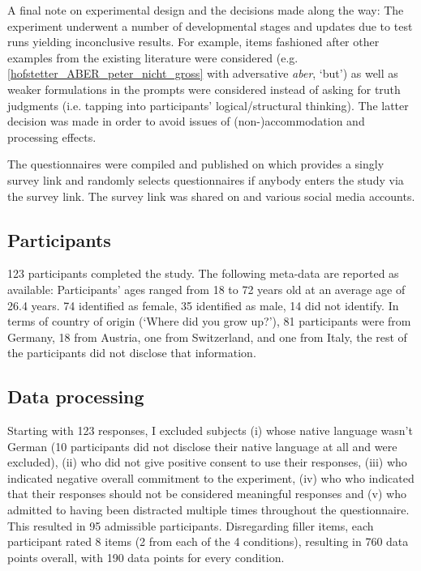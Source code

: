\documentclass[output=paper,
modfonts
]{langscibook}
\begin{document}
A final note on experimental design and the decisions made along the way: The experiment underwent a number of developmental stages and updates due to test runs yielding inconclusive results. For example, items fashioned after other examples from the existing literature were considered (e.g. \ref{hofstetter_ABER_peter_nicht_gross} with adversative \textit{aber}, `but') as well as weaker formulations in the prompts were considered instead of asking for truth judgments (i.e. tapping into participants' logical/structural thinking). The latter decision was made in order to avoid issues of (non-)accommodation and processing effects.

The questionnaires were compiled and published on \citet{sosci_website} which provides a singly survey link and randomly selects questionnaires if anybody enters the study via the survey link. The survey link was shared on \citet{survey_circle_website} and various social media accounts. 

\subsection{Participants}

123 participants completed the study. The following meta-data are reported as available: Participants' ages ranged from 18 to 72 years old at an average age of 26.4 years. 74 identified as female, 35 identified as male, 14 did not identify. In terms of country of origin (`Where did you grow up?'), 81 participants were from Germany, 18 from Austria, one from Switzerland, and one from Italy, the rest of the participants did not disclose that information.

\subsection{Data processing}

Starting with 123 responses, I excluded subjects (i) whose native language wasn't German (10 participants did not disclose their native language at all and were excluded), (ii) who did not give positive consent to use their responses, (iii) who indicated negative overall commitment to the experiment, (iv) who who indicated that their responses should not be considered meaningful responses and (v) who admitted to having been distracted multiple times throughout the questionnaire. This resulted in 95 admissible participants. Disregarding filler items, each participant rated 8 items (2 from each of the 4 conditions), resulting in 760 data points overall, with 190 data points for every condition.
\end{document}
